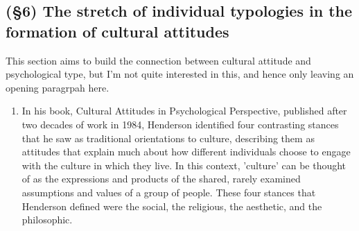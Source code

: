 
\subsection{(\S6) The stretch of individual typologies in the formation of cultural attitudes}

\begin{tipbox}
This section aims to build the connection between cultural attitude
and psychological type, but I'm not quite interested in this, and hence only leaving
an opening paragrpah here.
\end{tipbox}

\begin{enumerate}

\item {}
%
In his book, Cultural Attitudes in Psychological Perspective, published after
two decades of work in 1984, Henderson identified four contrasting stances that
he saw as traditional orientations to culture, describing them as attitudes
that explain much about how different individuals choose to engage with the
culture in which they live. In this context, 'culture' can be thought of as the
expressions and products of the shared, rarely examined assumptions and values
of a group of people. These four stances that Henderson defined were the
social, the religious, the aesthetic, and the philosophic.

\end{enumerate}
